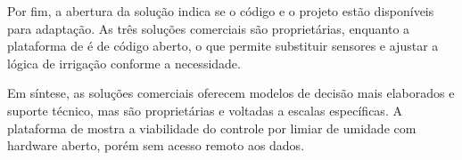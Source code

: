 Por fim, a abertura da solução indica se o código e o projeto estão
disponíveis para adaptação. As três soluções comerciais são proprietárias,
enquanto a plataforma de  é de código aberto, o que
permite substituir sensores e ajustar a lógica de
irrigação conforme a necessidade.

Em síntese, as soluções comerciais oferecem modelos de decisão mais elaborados
e suporte técnico, mas são proprietárias e voltadas a escalas específicas. A
plataforma de  mostra a viabilidade do controle por
limiar de umidade com hardware aberto, porém sem acesso remoto aos
dados.